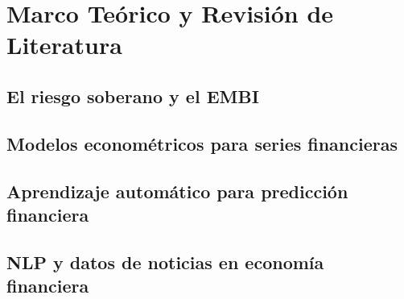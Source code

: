 \chapter{Marco Teórico y Revisión de Literatura}

\section{El riesgo soberano y el EMBI}

\section{Modelos econométricos para series financieras}

\section{Aprendizaje automático para predicción financiera}

\section{NLP y datos de noticias en economía financiera}

